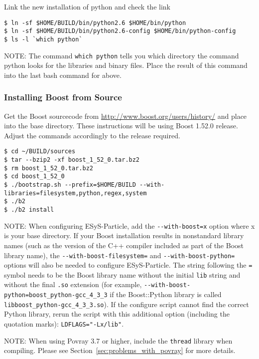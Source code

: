 Link the new installation of python and check the link
\begin{lstlisting}[style=inlineBash]
$ ln -sf $HOME/BUILD/bin/python2.6 $HOME/bin/python
$ ln -sf $HOME/BUILD/bin/python2.6-config $HOME/bin/python-config
$ ls -l `which python`
\end{lstlisting}

NOTE:
The command \lstinline{which python} tells you which directory the command python looks for the libraries and binary files. Place the result of this command into the last bash command for above.

\subsubsection{Installing Boost from Source}
\label{sub:installing_boost_from_source}

Get the Boost sourcecode from \url{http://www.boost.org/users/history/} and place into the base directory. These instructions will be using Boost 1.52.0 release. Adjust the commands accordingly to the release required.

\begin{lstlisting}[style=inlineBash]
$ cd ~/BUILD/sources
$ tar --bzip2 -xf boost_1_52_0.tar.bz2
$ rm boost_1_52_0.tar.bz2
$ cd boost_1_52_0
$ ./bootstrap.sh --prefix=$HOME/BUILD --with-libraries=filesystem,python,regex,system
$ ./b2
$ ./b2 install
\end{lstlisting}

NOTE:
When configuring ESyS-Particle, add the \lstinline{--with-boost=x} option where x is your base directory. If your Boost installation results in nonstandard library names (such as the version of the C++ compiler included as part of the Boost library name), the \lstinline{--with-boost-filesystem=} and \lstinline{--with-boost-python=} options will also be needed to configure ESyS-Particle. The string following the \lstinline{=} symbol needs to be the Boost library name without the initial \lstinline{lib} string and without the final \lstinline{.so} extension (for example, \lstinline{--with-boost-python=boost_python-gcc_4_3_3} if the Boost::Python library is called \lstinline{libboost_python-gcc_4_3_3.so}). If the configure script cannot find the correct Python library, rerun the script with this additional option (including the quotation marks): \lstinline{LDFLAGS="-Lx/lib"}.

NOTE: When using Povray 3.7 or higher, include the \lstinline{thread} library when compiling. Please see Section~\ref{sec:problems_with_povray} for more details.

